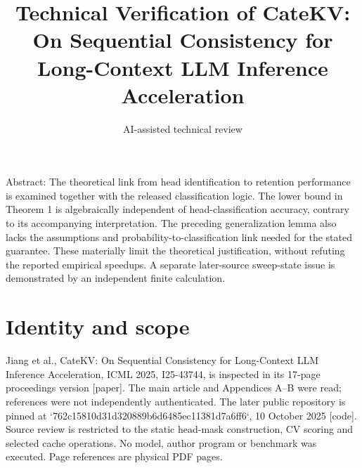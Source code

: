 \documentclass[10pt]{article}
\title{Technical Verification of
CateKV: On Sequential Consistency for Long-Context LLM Inference Acceleration}
\author{AI-assisted technical review}
\date{}
\begin{document}
\maketitle
Abstract: The theoretical link from head identification to retention performance is examined together with the released classification logic. The lower bound in Theorem 1 is algebraically independent of head-classification accuracy, contrary to its accompanying interpretation. The preceding generalization lemma also lacks the assumptions and probability-to-classification link needed for the stated guarantee. These materially limit the theoretical justification, without refuting the reported empirical speedups. A separate later-source sweep-state issue is demonstrated by an independent finite calculation.\par
\section*{Identity and scope}
Jiang et al., CateKV: On Sequential Consistency for Long-Context LLM Inference Acceleration, ICML 2025, I25-43744, is inspected in its 17-page proceedings version [paper]. The main article and Appendices A–B were read; references were not independently authenticated. The later public repository is pinned at `762c15810d31d320889b6d6485ec11381d7a6ff6`, 10 October 2025 [code]. Source review is restricted to the static head-mask construction, CV scoring and selected cache operations. No model, author program or benchmark was executed. Page references are physical PDF pages.\par
\end{document}
